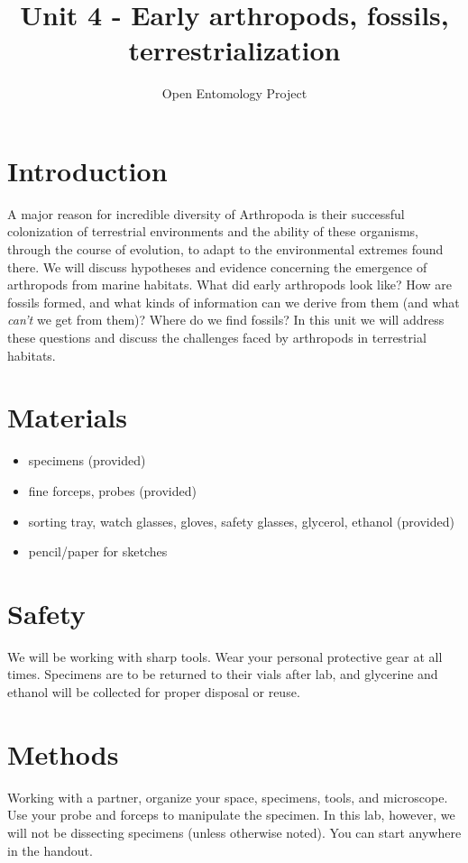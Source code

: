 \documentclass[letterpaper, 11pt]{article}
\title{Unit 4 - Early arthropods, fossils, terrestrialization}
\author{Open Entomology Project}
\begin{document}
\cleanlookdateon %
\maketitle
\thispagestyle{fancy}

\section*{Introduction}
A major reason for incredible diversity of Arthropoda is their successful colonization of terrestrial environments and the ability of these organisms, through the course of evolution, to adapt to the environmental extremes found there. We will discuss hypotheses and evidence concerning the emergence of arthropods from marine habitats. What did early arthropods look like? How are fossils formed, and what kinds of information can we derive from them (and what \textit{can't} we get from them)? Where do we find fossils? In this unit we will address these questions and discuss the challenges faced by arthropods in terrestrial habitats.

\section*{Materials}

\begin{itemize}
\item specimens (provided)
\item fine forceps, probes (provided)
\item sorting tray, watch glasses, gloves, safety glasses, glycerol, ethanol (provided)
\item pencil/paper for sketches
\end{itemize}

\section*{Safety}
We will be working with sharp tools. Wear your personal protective gear at all times. Specimens are to be returned to their vials after lab, and glycerine and ethanol will be collected for proper disposal or reuse.

\section*{Methods}
Working with a partner, organize your space, specimens, tools, and microscope. Use your probe and forceps to manipulate the specimen. In this lab, however, we will not be dissecting specimens (unless otherwise noted). You can start anywhere in the handout.
\end{document}
